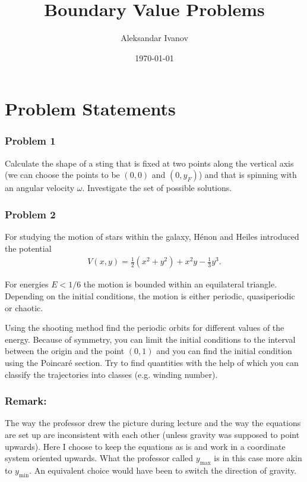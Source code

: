 \documentclass[10pt,a4paper,twocolumn]{article}
\begin{document}
\title{Boundary Value Problems}
\author{Aleksandar Ivanov}
\date{\today}
\maketitle

\section{Problem Statements}

\subsubsection*{Problem 1}

Calculate the shape of a sting that is fixed at two points along the vertical axis (we can choose the points to be $(0, 0)$ and $(0, y_F)$) and that is spinning with an angular velocity $\omega$. Investigate the set of possible solutions.

\subsubsection*{Problem 2}

For studying the motion of stars within the galaxy, H\'enon and Heiles \cite{hh} introduced the potential
%
\begin{align}
    V(x, y) = \frac{1}{2} \left( x^2 + y^2 \right) + x^2 y -\frac{1}{3} y^3.
\end{align}

For energies $E < 1/6$ the motion is bounded within an equilateral triangle. Depending on the initial conditions, the motion is either periodic, quasiperiodic or chaotic.

Using the shooting method find the periodic orbits for different values of the energy. Because of symmetry, you can limit the initial conditions to the interval between the origin and the point $(0, 1)$ and you can find the initial condition using the Poincar\'e section.
Try to find quantities with the help of which you can classify the trajectories into classes (e.g. winding number).

\subsubsection*{Remark:}

The way the professor drew the picture during lecture and the way the equations are set up are inconsistent with each other (unless gravity was supposed to point upwards). Here I choose to keep the equations as is and work in a coordinate system oriented upwards. What the professor called $y_{\mathrm{max}}$ is in this case more akin to $y_{\mathrm{min}}$. An equivalent choice would have been to switch the direction of gravity.
\end{document}
